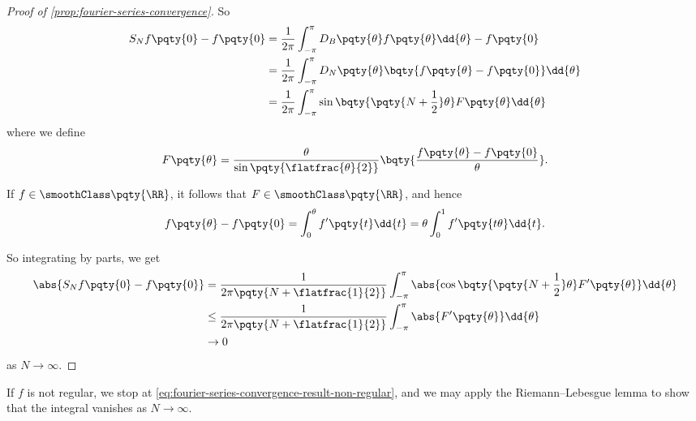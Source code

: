 \begin{proof}[Proof of \autoref{prop:fourier-series-convergence}]
    So
    \begin{subequations}
        \begin{align}
            S_N f\pqty{0} - f\pqty{0} &= \frac{1}{2 \pi} \int_{-\pi}^{\pi} D_B\pqty{\theta} f\pqty{\theta} \dd{\theta} - f\pqty{0} \\
            &= \frac{1}{2 \pi} \int_{-\pi}^{\pi} D_N\pqty{\theta} \bqty{f\pqty{\theta} - f\pqty{0}} \dd{\theta} \\
            &= \frac{1}{2 \pi} \int_{- \pi}^{\pi} \sin \bqty{\pqty{N + \frac{1}{2}} \theta} F\pqty{\theta} \dd{\theta} \label{eq:fourier-series-convergence-result-non-regular}%
        \end{align}
    \end{subequations}
    where we define
    \begin{equation}
        F\pqty{\theta} = \frac{\theta}{\sin\pqty{\flatfrac{\theta}{2}}} \bqty{\frac{f\pqty{\theta} - f\pqty{0}}{\theta}}.
    \end{equation}

    If \(f \in \smoothClass\pqty{\RR}\), it follows that \(F \in \smoothClass\pqty{\RR}\), and hence
    \begin{equation}
        f\pqty{\theta} - f\pqty{0} = \int_{0}^{\theta} f'\pqty{t} \dd{t} = \theta \int_{0}^{1} f'\pqty{t \theta} \dd{t}.
    \end{equation}

    So integrating by parts, we get
    \begin{subequations}
        \begin{align}
            \abs{S_N f\pqty{0} - f\pqty{0}} &= \frac{1}{2 \pi \pqty{N + \flatfrac{1}{2}}} \int_{- \pi}^{\pi} \abs{\cos\bqty{\pqty{N + \frac{1}{2}} \theta} F'\pqty{\theta}} \dd{\theta} \\
            &\leq \frac{1}{2 \pi \pqty{N + \flatfrac{1}{2}}} \int_{- \pi}^{\pi} \abs{F'\pqty{\theta}} \dd{\theta} \\
            &\to 0
        \end{align}
    \end{subequations}
    as \(N \to \infty\).
\end{proof}

\begin{remark}
    If \(f\) is not regular, we stop at \eqref{eq:fourier-series-convergence-result-non-regular}, and we may apply the Riemann--Lebesgue lemma to show that the integral vanishes as \(N \to \infty\).
\end{remark}

